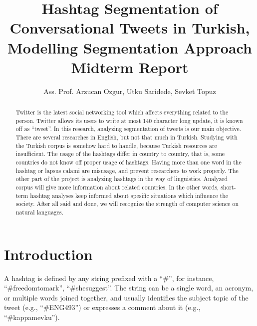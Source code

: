 \documentclass[12pt]{comjnl}
\begin{document}
\title[Hashtag Segmentation of Conversational Tweets in Turkish]{Hashtag Segmentation of Conversational Tweets in Turkish, Modelling Segmentation Approach Midterm Report}
\author{Ass. Prof. Arzucan Ozgur, Utku Saridede, Sevket Topuz}
 




\begin{abstract}
Twitter is the latest social networking tool which affects everything related to the person.
Twitter allows its users to write at most 140 character long update, it is known off as 
``tweet''. In this research, analyzing segmentation of tweets is our main objective. There are
several researches in English, but not that much in Turkish. Studying with the Turkish corpus is
somehow hard to handle, because Turkish resources are insufficient. The usage of the hashtags
differ in country to country, that is, some countries do not know off proper usage of hashtags.
Having more than one word in the hashtag or lapsus calami are misusage, and prevent researchers 
to work properly. The other part of the project is analyzing hashtags in the way of linguistics.
Analyzed corpus will give more information about related countries. In the other words, short-term
hashtag analyses keep informed about spesific situations which influence the society. After all said
and done, we will recognize the strength of computer science on natural languages.
\end{abstract}

\maketitle

\section{Introduction}
A hashtag is defined by any string prefixed with a ``\#'', for instance, “\#freedomtomark”,
“\#shesuggest”. The string can be a single word, an acronym, or multiple words joined
together, and usually identifies the subject topic of the tweet (e.g., “\#ENG493”)
or expresses a comment about it (e.g., “\#kappamevku”). 
\end{document}

